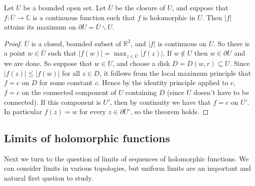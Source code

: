 \documentclass[egregdoesnotlikesansseriftitles,a4paper]{scrartcl}
\begin{document}
\begin{corollary}
      Let $U$ be a bounded open set. Let $\overline{U}$ be the closure of $U$, and suppose that $f: \overline{U}\rightarrow \mathbb{C}$ is a continuous function such that $f$ is holomorphic in $U$. Then $\left|f\right|$ attains its maximum on $\partial U= \overline{U}\backslash U$.
      \begin{proof}
            $\overline{U}$ is a closed, bounded subset of $\mathbb{R}^2$, and $\left|f\right|$ is continuous on $\overline{U}$. So there is a point $w \in \overline{U}$ such that $\left|f (w)\right|=\max_{z \in \overline{U}} \left|f (z)\right|$. If $w \notin U$ then $w \in \partial U$ and we are done. So suppose that $w \in U$, and choose a disk $D = D (w,r)\subseteq U$. Since $\left|f (z)\right|\leq \left|f (w)\right|$ for all $z \in D$, it follows from the local maximum principle that $f=c$ on $D$ for some constant $c$. Hence by the identity principle applied to $c$, $f=c$ on the connected component of $U$ containing $D$ (since $U$ doesn't have to be connected). If this component is $U'$, then by continuity we have that $f=c$ on $\overline{U'}$. In particular $f (z)=w$ for every $z \in \partial U'$, so the theorem holds. 
      \end{proof}
\end{corollary}
\subsection{Limits of holomorphic functions}
Next we turn to the question of limits of sequences of holomorphic functions. We can consider limits in various topologies, but uniform limits are an important and natural first qustion to study.
\end{document}
